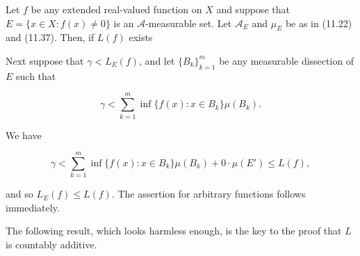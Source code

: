 Let $f$ be any extended real-valued function on $X$ and suppose that $E = \{x \in X : f(x) \neq 0\}$ is an $\mathcal{A}$-measurable set. Let $\mathcal{A}_E$ and $\mu_E$ be as in (11.22) and (11.37). Then, if $L(f)$ exists

Next suppose that $\gamma < L_E(f)$, and let $\{B_k\}_{k=1}^m$ be any measurable dissection of $E$ such that

$$\gamma < \sum_{k=1}^{m} \inf \{f(x) : x \in B_k\} \mu(B_k).$$

We have

$$\gamma < \sum_{k=1}^{m} \inf \{f(x) : x \in B_k\} \mu(B_k) + 0 \cdot \mu(E') \leq L(f),$$

and so $L_E(f) \leq L(f)$. The assertion for arbitrary functions follows immediately.

The following result, which looks harmless enough, is the key to the proof that $L$ is countably additive.